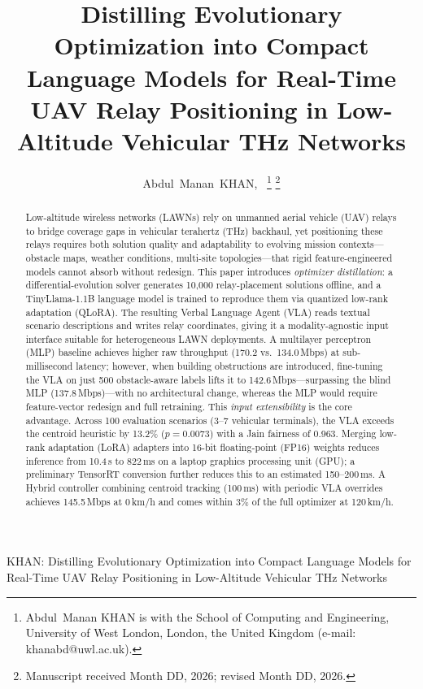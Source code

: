 \documentclass[journal]{IEEEtran}
\begin{document}
\title{Distilling Evolutionary Optimization into Compact Language Models for Real-Time UAV Relay Positioning in Low-Altitude Vehicular THz Networks}

\author{Abdul~Manan~KHAN,~%
\thanks{Abdul~Manan KHAN is with the School of Computing and Engineering, University of West London, London, the United Kingdom (e-mail: khanabd@uwl.ac.uk).}%
\thanks{Manuscript received Month DD, 2026; revised Month DD, 2026.}}

%
{KHAN: Distilling Evolutionary Optimization into Compact Language Models for Real-Time UAV Relay Positioning in Low-Altitude Vehicular THz Networks}

\maketitle

\begin{abstract}
Low-altitude wireless networks (LAWNs) rely on unmanned aerial vehicle (UAV) relays to bridge coverage gaps in vehicular terahertz (THz) backhaul, yet positioning these relays requires both solution quality and adaptability to evolving mission contexts---obstacle maps, weather conditions, multi-site topologies---that rigid feature-engineered models cannot absorb without redesign. This paper introduces \emph{optimizer distillation}: a differential-evolution solver generates 10{,}000 relay-placement solutions offline, and a TinyLlama-1.1B language model is trained to reproduce them via quantized low-rank adaptation (QLoRA). The resulting Verbal Language Agent (VLA) reads textual scenario descriptions and writes relay coordinates, giving it a modality-agnostic input interface suitable for heterogeneous LAWN deployments. A multilayer perceptron (MLP) baseline achieves higher raw throughput (170.2 vs.\ 134.0\,Mbps) at sub-millisecond latency; however, when building obstructions are introduced, fine-tuning the VLA on just 500 obstacle-aware labels lifts it to 142.6\,Mbps---surpassing the blind MLP (137.8\,Mbps)---with no architectural change, whereas the MLP would require feature-vector redesign and full retraining. This \emph{input extensibility} is the core advantage. Across 100 evaluation scenarios (3--7 vehicular terminals), the VLA exceeds the centroid heuristic by 13.2\% ($p{=}0.0073$) with a Jain fairness of 0.963. Merging low-rank adaptation (LoRA) adapters into 16-bit floating-point (FP16) weights reduces inference from 10.4\,s to 822\,ms on a laptop graphics processing unit (GPU); a preliminary TensorRT conversion further reduces this to an estimated 150--200\,ms. A Hybrid controller combining centroid tracking (100\,ms) with periodic VLA overrides achieves 145.5\,Mbps at 0\,km/h and comes within 3\% of the full optimizer at 120\,km/h.
\end{abstract}
\end{document}
